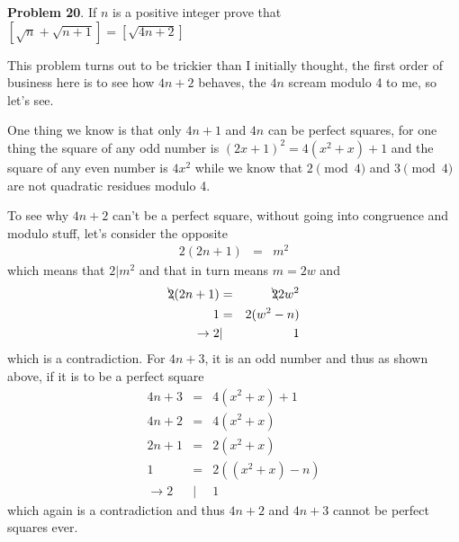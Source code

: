 \documentclass[aps,preprint,preprintnumbers,nofootinbib,showpacs,prd]{revtex4-1}
\newcommand{\nbea}{\begin{eqnarray*}}
\newcommand{\neea}{\end{eqnarray*}}
\begin{document}
{\bf Problem 20}. If $n$ is a positive integer prove that $[\sqrt{n} + \sqrt{n+1}] = [\sqrt{4n+2}]$

This problem turns out to be trickier than I initially thought, the first order of business here is to see how $4n+2$ behaves, the $4n$ scream modulo 4 to me, so let's see.

One thing we know is that only $4n+1$ and $4n$ can be perfect squares, for one thing the square of any odd number is $(2x+1)^2 = 4(x^2+x)+1$ and the square of any even number is $4x^2$ while we know that $2 \pmod{4}$ and $3 \pmod{4}$ are not quadratic residues modulo 4.

To see why $4n+2$ can't be a perfect square, without going into congruence and modulo stuff, let's consider the opposite
%
\nbea
2(2n+1) & = & m^2
\neea
%
which means that $2|m^2$ and that in turn means $m = 2w$ and
%
\nbea
\bcancel{2}(2n+1) & = & \bcancel{2}2w^2 \\
1 & = & 2 (w^2 - n) \\
\to 2 &|& 1
\neea
%
which is a contradiction. For $4n+3$, it is an odd number and thus as shown above, if it is to be a perfect square
%
\nbea
4n+3 & = & 4(x^2+x) + 1 \\
4n + 2 & = & 4(x^2+x) \\
2n + 1 & = & 2(x^2 + x) \\
1 & = & 2 ((x^2+x) - n) \\
\to 2 &|& 1
\neea
%
which again is a contradiction and thus $4n+2$ and $4n+3$ cannot be perfect squares ever.
\end{document}
